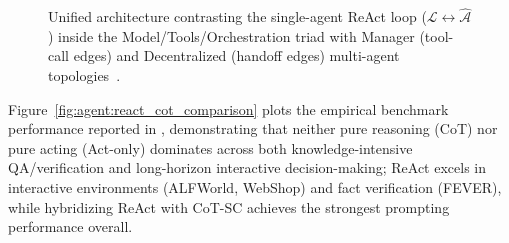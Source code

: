 \documentclass[../../../../master.tex]{subfiles}
\begin{document}
\begin{figure}[htbp]
{%
}
\caption{Unified architecture contrasting the single-agent ReAct loop ($\mathcal{L} \leftrightarrow \hat{\mathcal{A}}$) inside the Model/Tools/Orchestration triad  with Manager (tool-call edges) and Decentralized (handoff edges) multi-agent topologies~.}
\label{fig:agent:react_and_orchestration}
\end{figure}

Figure~\ref{fig:agent:react_cot_comparison} plots the empirical benchmark performance reported in , demonstrating that neither pure reasoning (CoT) nor pure acting (Act-only) dominates across both knowledge-intensive QA/verification and long-horizon interactive decision-making; ReAct excels in interactive environments (ALFWorld, WebShop) and fact verification (FEVER), while hybridizing ReAct with CoT-SC achieves the strongest prompting performance overall.
\end{document}
